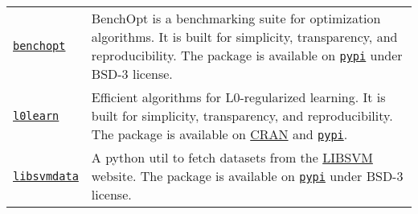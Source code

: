 \begin{longtable}[l]{@{}p{}p{}}
    \href{https://github.com/benchopt/benchopt}{\texttt{benchopt}} & BenchOpt is a benchmarking suite for optimization algorithms. It is built for simplicity, transparency, and reproducibility. The package is available on \href{https://pypi.org/project/benchopt/}{\texttt{pypi}} under BSD-3 license. \\
    \href{https://github.com/hazimehh/L0Learn}{\texttt{l0learn}} & Efficient algorithms for L0-regularized learning. It is built for simplicity, transparency, and reproducibility. The package is available on \href{https://cran.r-project.org/web/packages/L0Learn/index.html}{CRAN} and \href{https://pypi.org/project/l0learn/}{\texttt{pypi}}. \\
    \href{https://github.com/mathurinm/libsvmdata}{\texttt{libsvmdata}} & A python util to fetch datasets from the \href{https://www.csie.ntu.edu.tw/~cjlin/libsvmtools/datasets/}{LIBSVM} website. The package is available on \href{https://pypi.org/project/libsvmdata/}{\texttt{pypi}} under BSD-3 license. \\
\end{longtable}



